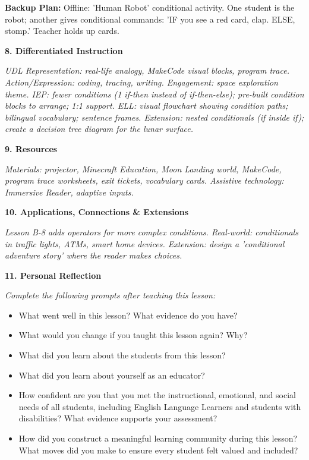 \documentclass[11pt,letterpaper]{article}
\begin{document}
\textbf{Backup Plan: }Offline: 'Human Robot' conditional activity. One student is the robot; another gives conditional commands: 'IF you see a red card, clap. ELSE, stomp.' Teacher holds up cards.

\newpage
\textbf{8. Differentiated Instruction}

\textit{UDL Representation: real-life analogy, MakeCode visual blocks, program trace. Action/Expression: coding, tracing, writing. Engagement: space exploration theme. IEP: fewer conditions (1 if-then instead of if-then-else); pre-built condition blocks to arrange; 1:1 support. ELL: visual flowchart showing condition paths; bilingual vocabulary; sentence frames. Extension: nested conditionals (if inside if); create a decision tree diagram for the lunar surface.}

\textbf{9. Resources}

\textit{Materials: projector, Minecraft Education, Moon Landing world, MakeCode, program trace worksheets, exit tickets, vocabulary cards. Assistive technology: Immersive Reader, adaptive inputs.}

\textbf{10. Applications, Connections \& Extensions}

\textit{Lesson B-8 adds operators for more complex conditions. Real-world: conditionals in traffic lights, ATMs, smart home devices. Extension: design a 'conditional adventure story' where the reader makes choices.}

\textbf{11. Personal Reflection}

\textit{Complete the following prompts after teaching this lesson:}

\begin{itemize}
  \item What went well in this lesson? What evidence do you have?

  \item What would you change if you taught this lesson again? Why?

  \item What did you learn about the students from this lesson?

  \item What did you learn about yourself as an educator?

  \item How confident are you that you met the instructional, emotional, and social needs of all students, including English Language Learners and students with disabilities? What evidence supports your assessment?

  \item How did you construct a meaningful learning community during this lesson? What moves did you make to ensure every student felt valued and included?
\end{itemize}
\end{document}
